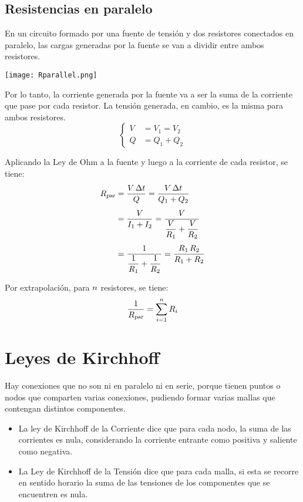 \documentclass[a5paper,12pt,twoside]{book}
\begin{document}
\subsection*{Resistencias en paralelo}

En un circuito formado por una fuente de tensión y dos resistores conectados en paralelo, las cargas generadas por la fuente se van a dividir entre ambos resistores.

\begin{center}
    \texttt{[image: Rparallel.png]}
\end{center}

Por lo tanto, la corriente generada por la fuente va a ser la suma de la corriente que pase por cada resistor. La tensión generada, en cambio, es la misma para ambos resistores.
\begin{equation*}
    \left\{
    \begin{aligned}
        V &= V_1 = V_2
        \\
        Q &= Q_1 + Q_2
    \end{aligned}
    \right.
\end{equation*}

Aplicando la Ley de Ohm a la fuente y luego a la corriente de cada resistor, se tiene:
\begin{align*}
    {{R}_\textsl{{par}}} &= \frac{V \, \Delta t}{Q} = \frac{V \, \Delta t}{Q_1 + Q_2}
    \\[1ex]
    &= \frac{V}{I_1 + I_2} = \frac{V}{\dfrac{V}{R_1} + \dfrac{V}{R_2}}
    \\[1ex]
    &= \frac{1}{\dfrac{1}{R_1}+\dfrac{1}{R_2}} = \frac{R_1 \, R_2}{R_1 + R_2}
\end{align*}

Por extrapolación, para $n$ resistores, se tiene:
\begin{equation}
    \frac{1}{{{R}_\textsl{{par}}}} = \sum_{i=1}^n R_i
\end{equation}


\section{Leyes de Kirchhoff}

Hay conexiones que no son ni en paralelo ni en serie, porque tienen puntos o nodos que comparten varias conexiones, pudiendo formar varias mallas que contengan distintos componentes.

\begin{itemize}
\item La ley de Kirchhoff de la Corriente dice que para cada nodo, la suma de las corrientes es nula, considerando la corriente entrante como positiva y saliente como negativa.

\item La Ley de Kirchhoff de la Tensión dice que para cada malla, si esta se recorre en sentido horario la suma de las tensiones de los componentes que se encuentren es nula.
\end{itemize}
\end{document}
